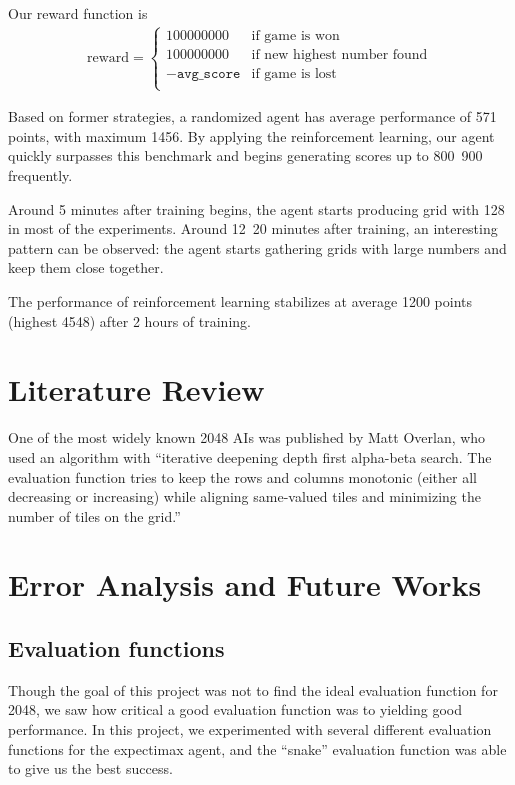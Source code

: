 \documentclass[9pt,twocolumn]{article}
\begin{document}
Our reward function is \begin{align*}
\text{reward} = 
\begin{cases} 
100000000 & \text{if game is won} \\
100000000 & \text{if new highest number found} \\
-\texttt{avg\_score} & \text{if game is lost} \\
\end{cases}
\end{align*}

Based on former strategies, a randomized agent has average performance of 571 points, with maximum 1456. By applying the reinforcement learning, our agent quickly surpasses this benchmark and begins generating scores up to 800~900 frequently. 

Around 5 minutes after training begins, the agent starts producing grid with 128 in most of the experiments. Around 12~20 minutes after training, an interesting pattern can be observed: the agent starts gathering grids with large numbers and keep them close together.

The performance of reinforcement learning stabilizes at average 1200 points (highest 4548) after 2 hours of training.

\section{Literature Review}

One of the most widely known 2048 AIs was published by Matt Overlan, who used an algorithm with “iterative deepening depth first alpha-beta search. The evaluation function tries to keep the rows and columns monotonic (either all decreasing or increasing) while aligning same-valued tiles and minimizing the number of tiles on the grid.”

\section{Error Analysis and Future Works}

\subsection{Evaluation functions}

Though the goal of this project was not to find the ideal evaluation function for 2048, we saw how critical a good evaluation function was to yielding good performance. In this project, we experimented with several different evaluation functions for the expectimax agent, and the “snake” evaluation function was able to give us the best success. 
\end{document}
